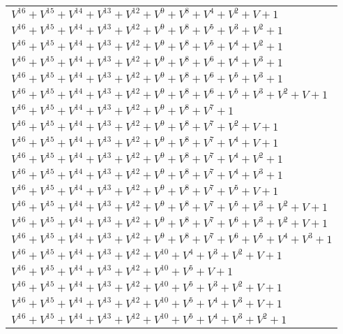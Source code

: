 \documentclass[12pt]{article}
\begin{document}
\begin{adjustwidth}{-4cm}{}
\begin{center}
\begin{longtable}{|l|}
$V^{16}  +V^{15}  +V^{14}  +V^{13}  +V^{12}  +V^{9}  +V^{8}  +V^{4}  +V^{2}  + V + 1$ \\
$V^{16}  +V^{15}  +V^{14}  +V^{13}  +V^{12}  +V^{9}  +V^{8}  +V^{5}  +V^{3}  +V^{2}  + 1$ \\
$V^{16}  +V^{15}  +V^{14}  +V^{13}  +V^{12}  +V^{9}  +V^{8}  +V^{5}  +V^{4}  +V^{2}  + 1$ \\
$V^{16}  +V^{15}  +V^{14}  +V^{13}  +V^{12}  +V^{9}  +V^{8}  +V^{6}  +V^{4}  +V^{3}  + 1$ \\
$V^{16}  +V^{15}  +V^{14}  +V^{13}  +V^{12}  +V^{9}  +V^{8}  +V^{6}  +V^{5}  +V^{3}  + 1$ \\
$V^{16}  +V^{15}  +V^{14}  +V^{13}  +V^{12}  +V^{9}  +V^{8}  +V^{6}  +V^{5}  +V^{3}  +V^{2}  + V + 1$ \\
$V^{16}  +V^{15}  +V^{14}  +V^{13}  +V^{12}  +V^{9}  +V^{8}  +V^{7}  + 1$ \\
$V^{16}  +V^{15}  +V^{14}  +V^{13}  +V^{12}  +V^{9}  +V^{8}  +V^{7}  +V^{2}  + V + 1$ \\
$V^{16}  +V^{15}  +V^{14}  +V^{13}  +V^{12}  +V^{9}  +V^{8}  +V^{7}  +V^{4}  + V + 1$ \\
$V^{16}  +V^{15}  +V^{14}  +V^{13}  +V^{12}  +V^{9}  +V^{8}  +V^{7}  +V^{4}  +V^{2}  + 1$ \\
$V^{16}  +V^{15}  +V^{14}  +V^{13}  +V^{12}  +V^{9}  +V^{8}  +V^{7}  +V^{4}  +V^{3}  + 1$ \\
$V^{16}  +V^{15}  +V^{14}  +V^{13}  +V^{12}  +V^{9}  +V^{8}  +V^{7}  +V^{5}  + V + 1$ \\
$V^{16}  +V^{15}  +V^{14}  +V^{13}  +V^{12}  +V^{9}  +V^{8}  +V^{7}  +V^{5}  +V^{3}  +V^{2}  + V + 1$ \\
$V^{16}  +V^{15}  +V^{14}  +V^{13}  +V^{12}  +V^{9}  +V^{8}  +V^{7}  +V^{6}  +V^{3}  +V^{2}  + V + 1$ \\
$V^{16}  +V^{15}  +V^{14}  +V^{13}  +V^{12}  +V^{9}  +V^{8}  +V^{7}  +V^{6}  +V^{5}  +V^{4}  +V^{3}  + 1$ \\
$V^{16}  +V^{15}  +V^{14}  +V^{13}  +V^{12}  +V^{10}  +V^{4}  +V^{3}  +V^{2}  + V + 1$ \\
$V^{16}  +V^{15}  +V^{14}  +V^{13}  +V^{12}  +V^{10}  +V^{5}  + V + 1$ \\
$V^{16}  +V^{15}  +V^{14}  +V^{13}  +V^{12}  +V^{10}  +V^{5}  +V^{3}  +V^{2}  + V + 1$ \\
$V^{16}  +V^{15}  +V^{14}  +V^{13}  +V^{12}  +V^{10}  +V^{5}  +V^{4}  +V^{3}  + V + 1$ \\
$V^{16}  +V^{15}  +V^{14}  +V^{13}  +V^{12}  +V^{10}  +V^{5}  +V^{4}  +V^{3}  +V^{2}  + 1$ \\

\end{longtable}
\end{center}
\end{adjustwidth}
\end{document}
